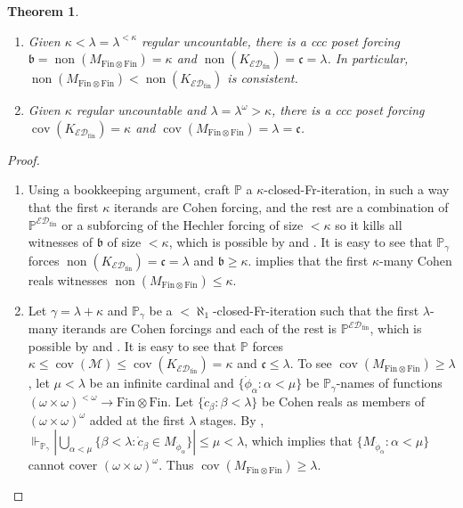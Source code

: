 \documentclass[a4paper,12pt]{amsart}
\newtheorem{thm}{Theorem}
\theoremstyle{definition}
\numberwithin{thm}{section}
\numberwithin{equation}{section}
\renewcommand{\a}{\alpha}
\renewcommand{\b}{\beta}
\newcommand{\p}{\mathbb{P}}
\newcommand{\bb}{\mathfrak{b}}
\newcommand{\cc}{\mathfrak{c}}
\DeclareMathOperator{\non}{non}
\DeclareMathOperator{\cov}{cov}
\newcommand{\covm}{\cov(\mathcal{M})}
\newcommand{\edfin}{\mathcal{ED}_\mathrm{fin}}
\newcommand{\finfin}{\mathrm{Fin}\otimes\mathrm{Fin}}
\newcommand{\continuum}{\mathfrak{c}}
\newcommand{\posetEDfin}{\mathbb{P}^{\edfin}}
\begin{document}
    \begin{thm}
    \label{thm:Con_nonMfinfin_nonKEDfin}
        \begin{enumerate}
            \item Given $\kappa<\lambda=\lambda^{<\kappa}$ regular uncountable, there is a ccc poset forcing $\bb=\non(M_{\finfin})=\kappa$ and $\non(K_{\edfin})=\cc=\lambda$.
            In particular, $\non(M_{\finfin})<\non(K_{\edfin})$ is consistent.
            \item Given $\kappa$ regular uncountable and $\lambda=\lambda^{\omega}>\kappa$, there is a ccc poset forcing $\cov(K_{\edfin})=\kappa$ and $\cov(M_{\finfin})=\lambda=\continuum$.
        \end{enumerate}
    \end{thm}
    \begin{proof}
        \begin{enumerate}
            \item Using a bookkeeping argument, craft $\p$ a $\kappa$-closed-Fr-iteration, in such a way that the first $\kappa$ iterands are Cohen forcing, and the rest are a combination of $\posetEDfin$ or a subforcing of the Hechler forcing of size $<\kappa$ so it kills all witnesses of $\bb$ of size $< \kappa$, which is possible by  and . It is easy to see that $\p_\gamma$ forces $\non(K_{\edfin})=\cc=\lambda$ and $\bb\geq\kappa$.  implies that the first $\kappa$-many Cohen reals witnesses $\non(M_{\finfin})\leq\kappa$.
            \item  Let $\gamma=\lambda+\kappa$ and $\p_\gamma$ be a $<\aleph_1$-closed-Fr-iteration such that the first $\lambda$-many iterands are Cohen forcings and each of the rest is $\posetEDfin$, which is possible by  and . It is easy to see that $\p$ forces $\kappa\leq\covm\leq\cov(K_{\edfin})=\kappa$ and $\cc\leq\lambda$.
            To see $\cov(M_{\finfin})\geq\lambda$,
            let $\mu<\lambda$ be an infinite cardinal and $\{\dot{\phi}_\a:\a<\mu\}$ be $\p_\gamma$-names of functions $(\omega\times\omega)^{<\omega}\to\finfin$. 
            Let $\{\dot{c}_\b:\b<\lambda\}$ be Cohen reals as members of $(\omega\times\omega)^\omega$ added at the first $\lambda$ stages. By , $\Vdash_{\p_\gamma}|\bigcup_{\a<\mu}\{\b<\lambda:\dot{c}_\b\in M_{\dot{\phi}_\a}\}|\leq\mu<\lambda$, which implies that $\{M_{\dot{\phi}_\a}:\a<\mu\}$ cannot cover $(\omega\times\omega)^\omega$. Thus $\cov(M_{\finfin})\geq\lambda$.
        \end{enumerate}
    \end{proof}
    
\end{document}

